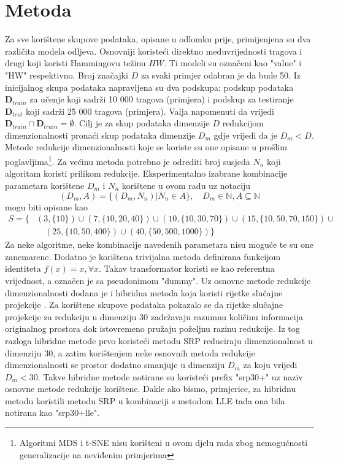 \documentclass[times, utf8, diplomski]{fer}
\begin{document}
\section{Metoda}

Za sve korištene skupove podataka, opisane u odlomku prije, primijenjena su dva različita modela odljeva. Osnovniji koristeći direktno međuvrijednosti tragova i drugi koji koristi Hammingovu težinu $HW$. Ti modeli su označeni kao "value" i "HW" respektivno. Broj značajki $D$ za svaki primjer odabran je da bude 50. Iz inicijalnog skupa podataka napravljena su dva podskupa: podskup podataka $\bm{D}_{train}$ za učenje koji sadrži 10 000 tragova (primjera) i podskup za testiranje $\bm{D}_{test}$ koji sadrži 25 000 tragova (primjera). Valja napomenuti da vrijedi $\bm{D}_{train} \cap \bm{D}_{train} = \emptyset$. Cilj je za skup podataka dimenzije $D$ redukcijom dimenzionalnosti pronaći skup podataka dimenzije $D_m$ gdje vrijedi da je $D_m < D$.
Metode redukcije dimenzionalnosti koje se koriste su one opisane u prošlim poglavljima\footnote{Algoritmi MDS i t-SNE nisu korišteni u ovom djelu rada zbog nemogućnosti generalizacije na neviđenim primjerima}. Za većinu metoda potrebno je odrediti broj susjeda $N_n$ koji algoritam koristi prilikom redukcije. Eksperimentalno izabrane kombinacije parametara korištene $D_m$ i $N_n$ korištene u ovom radu uz notaciju
\[(D_m, A) = \{(D_m, N_n) | N_n \in A\}, \quad D_m \in \mathbb{N}, A \subseteq \mathbb{N} \]
mogu biti opisane kao
\begin{align*}
    S = \{
     & (3, \{10\}) \cup
    (7, \{10, 20, 40\}) \cup
    (10, \{10, 30, 70\}) \cup
    (15, \{10, 50, 70, 150\}) \cup     \\
     & \quad(25, \{10, 50, 400\}) \cup
    (40, \{50, 500, 1000\})
    \}
\end{align*} Za neke algoritme, neke kombinacije navedenih parametara nisu moguće te su one zanemarene. Dodatno je korištena trivijalna metoda definirana funkcijom identiteta $f(x) = x, \forall x$. Takav transformator koristi se kao referentna vrijednost, a označen je sa pseudonimom "dummy". Uz osnovne metode redukcije dimenzionalnosti dodana je i hibridna metoda koja koristi rijetke slučajne projekcije . Za korištene skupove podataka pokazalo se da rijetke slučajne projekcije za redukciju u dimenziju 30 zadržavaju razumnu količinu informacija originalnog prostora dok istovremeno pružaju poželjnu razinu redukcije. Iz tog razloga hibridne metode prvo koristeći metodu SRP reduciraju dimenzionalnost u dimenziju 30, a zatim korištenjem neke osnovnih metoda redukcije dimenzionalnosti se prostor dodatno smanjuje u dimenziju $D_m$ za koju vrijedi $D_m < 30$. Takve hibridne metode notirane su koristeći prefix "srp30+" uz naziv osnovne metode redukcije korištene. Dakle ako bismo, primjerice, za hibridnu metodu koristili metodu SRP u kombinaciji s metodom LLE tada ona bila notirana kao "srp30+lle".
\end{document}
